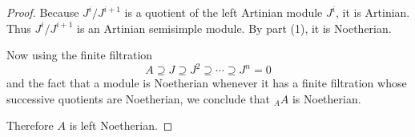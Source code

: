 \begin{proof}
    Because $J^i/J^{i+1}$ is a quotient of the left Artinian module $J^i$, it is Artinian.
    Thus $J^i/J^{i+1}$ is an Artinian semisimple module. By part \textup{(1)}, it is
    Noetherian.

    Now using the finite filtration
    \[
        A\supseteq J\supseteq J^2\supseteq \cdots \supseteq J^n=0
    \]
    and the fact that a module is Noetherian whenever it has a finite filtration whose
    successive quotients are Noetherian, we conclude that ${}_A A$ is Noetherian.

    Therefore $A$ is left Noetherian.
\end{proof}

